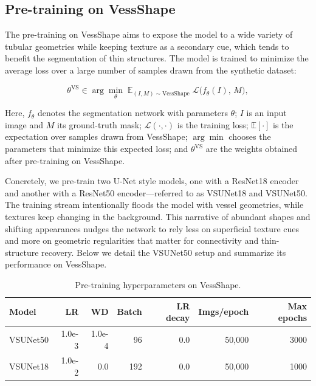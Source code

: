 \documentclass[%
reprint,
nofootinbib,
 amsmath,amssymb,
aps,
superscriptaddress,
showkeys,
longbibliography
]{revtex4-1}
\begin{document}
\subsection{Pre-training on VessShape}

The pre-training on VessShape aims to expose the model to a wide variety of tubular geometries while keeping texture as a secondary cue, which tends to benefit the segmentation of thin structures. The model is trained to minimize the average loss over a large number of samples drawn from the synthetic dataset:

\begin{equation}
    \theta^{\mathrm{VS}} \in \arg\min_{\theta} \; \mathbb{E}_{(I,M) \sim \mathrm{VessShape}} \; \mathcal{L}\big(f_{\theta}(I),\, M\big),
\end{equation}

Here, $f_{\theta}$ denotes the segmentation network with parameters $\theta$; $I$ is an input image and $M$ its ground-truth mask; $\mathcal{L}(\cdot,\cdot)$ is the training loss; $\mathbb{E}[\cdot]$ is the expectation over samples drawn from VessShape; $\arg\min$ chooses the parameters that minimize this expected loss; and $\theta^{\mathrm{VS}}$ are the weights obtained after pre-training on VessShape.

Concretely, we pre-train two U-Net style models, one with a ResNet18 encoder and another with a ResNet50 encoder—referred to as VSUNet18 and VSUNet50. The training stream intentionally floods the model with vessel geometries, while textures keep changing in the background. This narrative of abundant shapes and shifting appearances nudges the network to rely less on superficial texture cues and more on geometric regularities that matter for connectivity and thin-structure recovery. Below we detail the VSUNet50 setup and summarize its performance on VessShape.

\begin{table}[t]
    \caption{Pre-training hyperparameters on VessShape.}
    \label{tab:vs_hparams}
    \centering
    \begingroup
    \small
    \setlength{\tabcolsep}{3pt}
    \renewcommand{\arraystretch}{1.15}
    \begin{tabularx}{\textwidth}{l r r r r r r}
        \hline
        	\textbf{Model} & \textbf{LR} & \textbf{WD} & \textbf{Batch} & \textbf{LR decay} & \textbf{Imgs/epoch} & \textbf{Max epochs} \\
        \hline
        VSUNet50 & 1.0e-3 & 1.0e-4 & 96 & 0.0 & 50{,}000 & 3000 \\
        VSUNet18 & 1.0e-2 & 0.0 & 192 & 0.0 & 50{,}000 & 1000 \\
        \hline
    \end{tabularx}
    \endgroup
\end{table}
\end{document}
